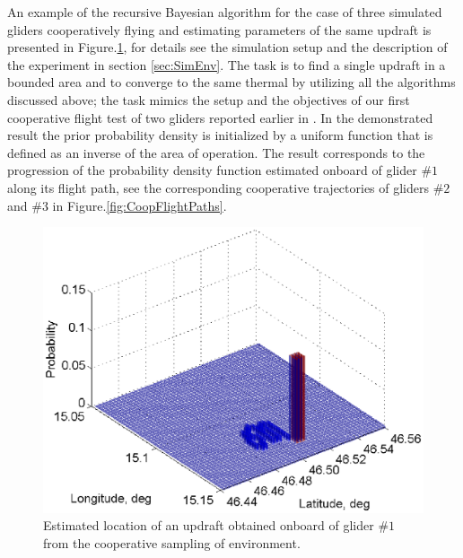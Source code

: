 \documentclass{ifacconf}
\begin{document}
An example of the recursive Bayesian algorithm for the case of three simulated gliders
cooperatively flying and estimating parameters of the same updraft is presented in
Figure.\ref{fig:SimPDF}, for details see the simulation setup and the description of the
experiment in section \ref{sec:SimEnv}. The task is to find a single updraft in a bounded
area and to converge to the same thermal by utilizing all the algorithms discussed above;
the task mimics the setup and the objectives of our first cooperative flight test of two
gliders reported earlier in \cite{AKlass_JGCD:2012}. In the demonstrated result the prior
probability density is initialized by a uniform function that is defined as an inverse of
the area of operation. The result corresponds to the progression of the probability
density function estimated onboard of glider $\#1$ along its flight path, see the
corresponding cooperative trajectories of gliders $\#2$ and $\#3$ in
Figure.\ref{fig:CoopFlightPaths}.
\begin{figure}[thpb]
  \centering
  \includegraphics[scale=0.525]{Figures/Mapping_thermals.eps}
  \caption{Estimated location of an updraft obtained onboard of glider $\#1$ from the cooperative sampling of
  environment.}
  \label{fig:SimPDF}
\end{figure}
\end{document}
